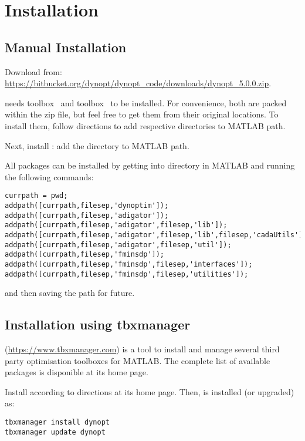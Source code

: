 \section{Installation}
\label{sec:instdynopt}

\subsection{Manual Installation}
Download  from:\\
\url{https://bitbucket.org/dynopt/dynopt_code/downloads/dynopt_5.0.0.zip}. 

 needs  toolbox~\citep{fminsdp} and
 toolbox~\citep{wei17} to be installed. For convenience,
both are packed within the zip file, but feel free to get them
from their original locations. To install them, follow directions to add
respective directories to MATLAB path.

Next, install : add the directory  to
MATLAB path. 

All packages can be installed by getting into 
directory in MATLAB and running the following commands:
\begin{verbatim}
currpath = pwd;
addpath([currpath,filesep,'dynoptim']);
addpath([currpath,filesep,'adigator']);
addpath([currpath,filesep,'adigator',filesep,'lib']);
addpath([currpath,filesep,'adigator',filesep,'lib',filesep,'cadaUtils']);
addpath([currpath,filesep,'adigator',filesep,'util']);
addpath([currpath,filesep,'fminsdp']);
addpath([currpath,filesep,'fminsdp',filesep,'interfaces']);
addpath([currpath,filesep,'fminsdp',filesep,'utilities']);
\end{verbatim}
and then saving the path for future.

\subsection{Installation using tbxmanager}
 (\url{https://www.tbxmanager.com}) is a tool to
install and manage several third party optimisation toolboxes for
MATLAB.  The complete list of available packages is disponible at its
home page.

Install  according to directions at its home
page. Then,  is installed (or upgraded) as:
\begin{verbatim}
tbxmanager install dynopt
tbxmanager update dynopt
\end{verbatim}

